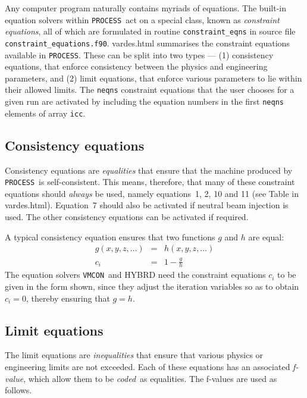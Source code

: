 \documentclass[11pt,a4paper]{report}
\newcommand{\process}{\mbox{\texttt{PROCESS}}}
\newcommand{\vmcon}{\mbox{\texttt{VMCON}}}
\begin{document}
Any computer program naturally contains myriads of equations. The built-in
equation solvers within \process\ act on a special class, known as
\textit{constraint equations}, all of which are formulated in routine
\texttt{constraint\_eqns} in source file
\texttt{constraint\_equations.f90}. vardes.html summarises the
constraint equations available in \process. These can be split into two types
--- (1) consistency equations, that enforce consistency between the physics
and engineering parameters, and (2) limit equations, that enforce various
parameters to lie within their allowed limits. The \texttt{neqns} constraint
equations that the user chooses for a given run are activated by including the
equation numbers in the first \texttt{neqns} elements of array \texttt{icc}.

\subsection{Consistency equations}

Consistency equations are \textit{equalities}\/ that ensure that the
machine produced by \process\ is self-consistent. This means, therefore, that
many of these constraint equations should \textit{always}\/ be used, namely
equations~1, 2, 10 and 11 (see Table in vardes.html).  Equation~7 should also
be activated if neutral beam injection is used.  The other consistency
equations can be activated if required.

A typical consistency equation ensures that two functions $g$ and $h$ are
equal:
\begin{eqnarray*}
g(x,y,z,\ldots) & = & h(x,y,z,\ldots) \\
c_i & = & 1 - \frac{g}{h}
\end{eqnarray*}
The equation solvers \vmcon\ and HYBRD need the constraint equations $c_i$ to be
given in the form shown, since they adjust the iteration variables so as to
obtain $c_i = 0$, thereby ensuring that $g = h$.

\subsection{Limit equations}
\label{subsec:limit}

The limit equations are \textit{inequalities}\/ that ensure that
various physics or engineering limits are not exceeded. Each of these
equations has an associated \textit{f-value}, which allow them to be
\textit{coded}\ as equalities. The f-values are used as follows.
\end{document}
